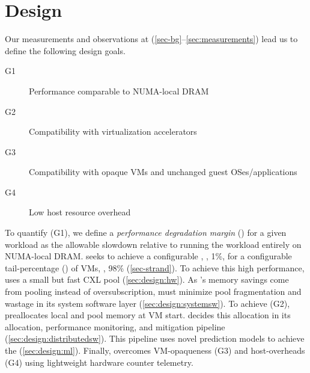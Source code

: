 \section{\sys Design}
\label{sec-des}


Our measurements and observations at \azure (\sec\ref{sec-bg}--\ref{sec:measurements}) lead us to define the following design goals.
\begin{description}
\item[G1] Performance comparable to NUMA-local DRAM
\item[G2] Compatibility with virtualization accelerators
\item[G3] Compatibility with opaque VMs and unchanged guest OSes\slash applications
\item[G4] Low host resource overhead
\end{description}

To quantify (G1), we define a \emph{performance degradation margin} (\pdm) for a given workload as the allowable slowdown relative to running the workload entirely on NUMA-local DRAM.
\sys seeks to achieve a configurable \pdm, \eg, 1\%, for a configurable tail-percentage (\tp) of VMs, \eg, 98\% (\sec\ref{sec-strand}).
To achieve this high performance, \sys uses a small but fast CXL pool (\sec\ref{sec:design:hw}).
As \sys's memory savings come from pooling instead of oversubscription, \sys must minimize pool fragmentation and wastage in its system software layer (\sec\ref{sec:design:systemsw}).
To achieve (G2), \sys preallocates local and pool memory at VM start.
\sys decides this allocation in its allocation, performance monitoring, and mitigation pipeline (\sec\ref{sec:design:distributedsw}).
This pipeline uses novel prediction models to achieve the \pdm (\sec\ref{sec:design:ml}).
Finally, \sys overcomes VM-opaqueness (G3) and host-overheads (G4) using lightweight hardware counter telemetry.




